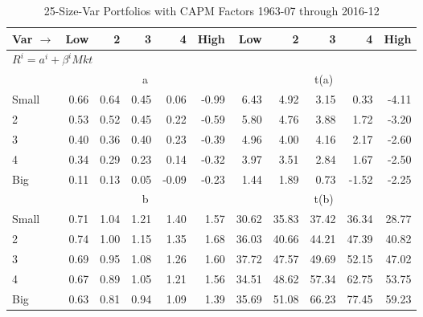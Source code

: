 
\begin{table}[!ht]
\footnotesize
\centering
\caption{25-Size-Var Portfolios with CAPM Factors 1963-07 through 2016-12}
\begin{tabular}{lrrrrrrrrrr}
  \toprule
    Var $\rightarrow$ & Low & 2 & 3 & 4 & High & Low & 2 & 3 & 4 & High \\ 
  \midrule
  \multicolumn{11}{l}{$R^i=a^i+\beta^iMkt$} \\

  
    
      & \multicolumn{5}{c}{a} & \multicolumn{5}{c}{t(a)}
    
    \\
      \cmidrule(r){2-6} \cmidrule(r){7-11}

    Small   & 0.66  & 0.64  & 0.45  & 0.06  & -0.99  & 6.43  & 4.92  & 3.15  & 0.33  & -4.11  \\
         2  & 0.53  & 0.52  & 0.45  & 0.22  & -0.59  & 5.80  & 4.76  & 3.88  & 1.72  & -3.20  \\
         3  & 0.40  & 0.36  & 0.40  & 0.23  & -0.39  & 4.96  & 4.00  & 4.16  & 2.17  & -2.60  \\
         4  & 0.34  & 0.29  & 0.23  & 0.14  & -0.32  & 3.97  & 3.51  & 2.84  & 1.67  & -2.50  \\
    Big     & 0.11  & 0.13  & 0.05  & -0.09  & -0.23  & 1.44  & 1.89  & 0.73  & -1.52  & -2.25  \\

  
    
      & \multicolumn{5}{c}{b} & \multicolumn{5}{c}{t(b)}
    
    \\
      \cmidrule(r){2-6} \cmidrule(r){7-11}

    Small   & 0.71  & 1.04  & 1.21  & 1.40  & 1.57  & 30.62  & 35.83  & 37.42  & 36.34  & 28.77  \\
         2  & 0.74  & 1.00  & 1.15  & 1.35  & 1.68  & 36.03  & 40.66  & 44.21  & 47.39  & 40.82  \\
         3  & 0.69  & 0.95  & 1.08  & 1.26  & 1.60  & 37.72  & 47.57  & 49.69  & 52.15  & 47.02  \\
         4  & 0.67  & 0.89  & 1.05  & 1.21  & 1.56  & 34.51  & 48.62  & 57.34  & 62.75  & 53.75  \\
    Big     & 0.63  & 0.81  & 0.94  & 1.09  & 1.39  & 35.69  & 51.08  & 66.23  & 77.45  & 59.23  \\

  

  \bottomrule
\end{tabular}
\label{tbl:25_Size_Var_CAPM}
\end{table}